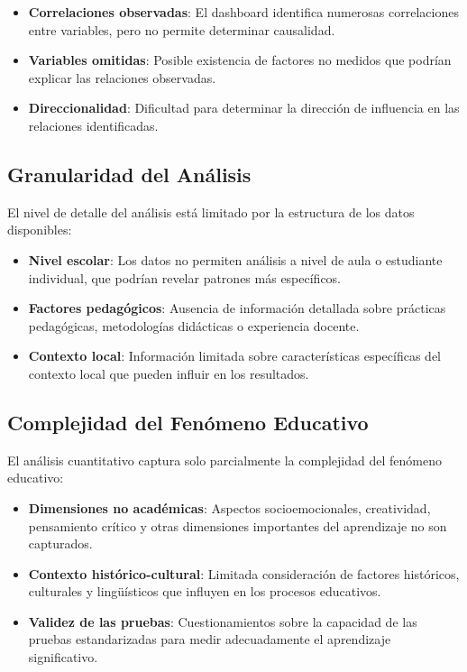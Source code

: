 \begin{itemize}
    \item \textbf{Correlaciones observadas}: El dashboard identifica numerosas correlaciones entre variables, pero no permite determinar causalidad.
    
    \item \textbf{Variables omitidas}: Posible existencia de factores no medidos que podrían explicar las relaciones observadas.
    
    \item \textbf{Direccionalidad}: Dificultad para determinar la dirección de influencia en las relaciones identificadas.
\end{itemize}

\subsection{Granularidad del Análisis}
El nivel de detalle del análisis está limitado por la estructura de los datos disponibles:

\begin{itemize}
    \item \textbf{Nivel escolar}: Los datos no permiten análisis a nivel de aula o estudiante individual, que podrían revelar patrones más específicos.
    
    \item \textbf{Factores pedagógicos}: Ausencia de información detallada sobre prácticas pedagógicas, metodologías didácticas o experiencia docente.
    
    \item \textbf{Contexto local}: Información limitada sobre características específicas del contexto local que pueden influir en los resultados.
\end{itemize}

\subsection{Complejidad del Fenómeno Educativo}
El análisis cuantitativo captura solo parcialmente la complejidad del fenómeno educativo:

\begin{itemize}
    \item \textbf{Dimensiones no académicas}: Aspectos socioemocionales, creatividad, pensamiento crítico y otras dimensiones importantes del aprendizaje no son capturados.
    
    \item \textbf{Contexto histórico-cultural}: Limitada consideración de factores históricos, culturales y lingüísticos que influyen en los procesos educativos.
    
    \item \textbf{Validez de las pruebas}: Cuestionamientos sobre la capacidad de las pruebas estandarizadas para medir adecuadamente el aprendizaje significativo.
\end{itemize}

